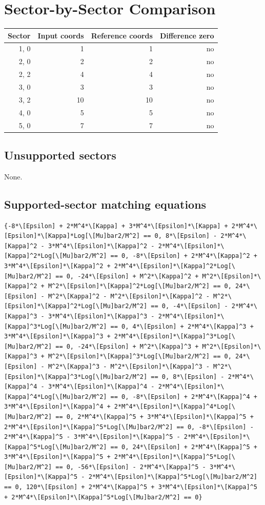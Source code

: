 \documentclass[11pt]{article}
\begin{document}
\section{Sector-by-Sector Comparison}
\begin{longtable}{rrrr}
\toprule
Sector & Input coords & Reference coords & Difference zero \\
\midrule
{1, 0} & 1 & 1 & no \\
{2, 0} & 2 & 2 & no \\
{2, 2} & 4 & 4 & no \\
{3, 0} & 3 & 3 & no \\
{3, 2} & 10 & 10 & no \\
{4, 0} & 5 & 5 & no \\
{5, 0} & 7 & 7 & no \\
\bottomrule
\end{longtable}
\subsection{Unsupported sectors}
None.
\subsection{Supported-sector matching equations}
\begin{verbatim}
{-8*\[Epsilon] + 2*M^4*\[Kappa] + 3*M^4*\[Epsilon]*\[Kappa] + 2*M^4*\[Epsilon]*\[Kappa]*Log[\[Mu]bar2/M^2] == 0, 8*\[Epsilon] - 2*M^4*\[Kappa]^2 - 3*M^4*\[Epsilon]*\[Kappa]^2 - 2*M^4*\[Epsilon]*\[Kappa]^2*Log[\[Mu]bar2/M^2] == 0, -8*\[Epsilon] + 2*M^4*\[Kappa]^2 + 3*M^4*\[Epsilon]*\[Kappa]^2 + 2*M^4*\[Epsilon]*\[Kappa]^2*Log[\[Mu]bar2/M^2] == 0, -24*\[Epsilon] + M^2*\[Kappa]^2 + M^2*\[Epsilon]*\[Kappa]^2 + M^2*\[Epsilon]*\[Kappa]^2*Log[\[Mu]bar2/M^2] == 0, 24*\[Epsilon] - M^2*\[Kappa]^2 - M^2*\[Epsilon]*\[Kappa]^2 - M^2*\[Epsilon]*\[Kappa]^2*Log[\[Mu]bar2/M^2] == 0, -4*\[Epsilon] - 2*M^4*\[Kappa]^3 - 3*M^4*\[Epsilon]*\[Kappa]^3 - 2*M^4*\[Epsilon]*\[Kappa]^3*Log[\[Mu]bar2/M^2] == 0, 4*\[Epsilon] + 2*M^4*\[Kappa]^3 + 3*M^4*\[Epsilon]*\[Kappa]^3 + 2*M^4*\[Epsilon]*\[Kappa]^3*Log[\[Mu]bar2/M^2] == 0, -24*\[Epsilon] + M^2*\[Kappa]^3 + M^2*\[Epsilon]*\[Kappa]^3 + M^2*\[Epsilon]*\[Kappa]^3*Log[\[Mu]bar2/M^2] == 0, 24*\[Epsilon] - M^2*\[Kappa]^3 - M^2*\[Epsilon]*\[Kappa]^3 - M^2*\[Epsilon]*\[Kappa]^3*Log[\[Mu]bar2/M^2] == 0, 8*\[Epsilon] - 2*M^4*\[Kappa]^4 - 3*M^4*\[Epsilon]*\[Kappa]^4 - 2*M^4*\[Epsilon]*\[Kappa]^4*Log[\[Mu]bar2/M^2] == 0, -8*\[Epsilon] + 2*M^4*\[Kappa]^4 + 3*M^4*\[Epsilon]*\[Kappa]^4 + 2*M^4*\[Epsilon]*\[Kappa]^4*Log[\[Mu]bar2/M^2] == 0, 2*M^4*\[Kappa]^5 + 3*M^4*\[Epsilon]*\[Kappa]^5 + 2*M^4*\[Epsilon]*\[Kappa]^5*Log[\[Mu]bar2/M^2] == 0, -8*\[Epsilon] - 2*M^4*\[Kappa]^5 - 3*M^4*\[Epsilon]*\[Kappa]^5 - 2*M^4*\[Epsilon]*\[Kappa]^5*Log[\[Mu]bar2/M^2] == 0, 24*\[Epsilon] + 2*M^4*\[Kappa]^5 + 3*M^4*\[Epsilon]*\[Kappa]^5 + 2*M^4*\[Epsilon]*\[Kappa]^5*Log[\[Mu]bar2/M^2] == 0, -56*\[Epsilon] - 2*M^4*\[Kappa]^5 - 3*M^4*\[Epsilon]*\[Kappa]^5 - 2*M^4*\[Epsilon]*\[Kappa]^5*Log[\[Mu]bar2/M^2] == 0, 120*\[Epsilon] + 2*M^4*\[Kappa]^5 + 3*M^4*\[Epsilon]*\[Kappa]^5 + 2*M^4*\[Epsilon]*\[Kappa]^5*Log[\[Mu]bar2/M^2] == 0}
\end{verbatim}
\end{document}
